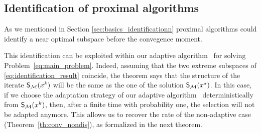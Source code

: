 


\subsection{Identification of proximal algorithms}\label{sec:identif}
{\color{red} As we mentioned in Section \ref{sec:basics_identificationn} proximal algorithms could identify a near optimal subspace before the convegence moment.}

This identification can be exploited within our adaptive algorithm \adaalgo~for solving Problem~\eqref{eq:main_problem}. Indeed, assuming that the two extreme subspaces of \eqref{eq:identification_result} coincide, the theorem says that the structure of the iterate $\S(x^k)$ will be the same as the one of the solution $\S(x^\star)$. In this case, if we choose the adaptation strategy of our adaptive algorithm \adaalgo~deterministically from $\S(x^k)$, then, after a finite time with probability one,  the selection will not be adapted anymore. This allows us to recover the rate of the non-adaptive case (Theorem~\ref{th:conv_nondis}), as formalized in the next theorem.


